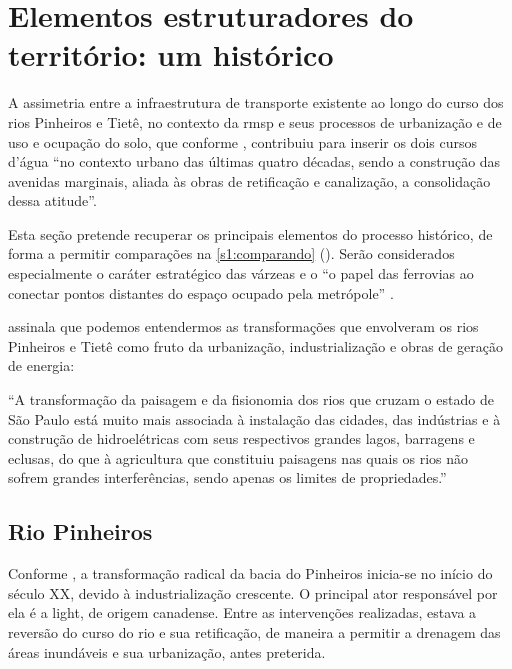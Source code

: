 \documentclass[
article,			%
11pt,				%
oneside,			%
a4paper,			%
english,			%
brazil,				%
sumario=tradicional
]{abntex2}
\begin{document}
	\section{Elementos estruturadores do território: um histórico} \label{s1:elementos}
	
	
	A assimetria entre a infraestrutura de transporte existente ao longo do curso dos rios Pinheiros e Tietê, no contexto da \glsdesc{rmsp} e seus processos de urbanização e de uso e ocupação do solo, que conforme , contribuiu para inserir os dois cursos d'água ``no contexto urbano das últimas quatro décadas, sendo a construção das avenidas marginais, aliada às obras de retificação e canalização, a consolidação dessa atitude''.
	
	Esta seção pretende recuperar os principais elementos do processo histórico, de forma a permitir comparações na \autoref{s1:comparando} (). Serão considerados especialmente o caráter estratégico das várzeas \cite[p.63]{franco2005a} e o ``o papel das ferrovias ao conectar pontos distantes do espaço ocupado pela metrópole'' \cite[p.63]{franco2005a}.
	
	 assinala que podemos entendermos as transformações que envolveram os rios Pinheiros e Tietê como fruto da urbanização, industrialização e obras de geração de energia:
	
	\begin{citacao}
		``A transformação da paisagem e da fisionomia dos rios que cruzam o estado de São Paulo está muito mais associada à instalação das cidades, das indústrias e à construção de hidroelétricas com seus respectivos grandes lagos, barragens e eclusas, do que à agricultura que constituiu paisagens nas quais os rios não sofrem grandes interferências, sendo apenas os limites de propriedades.''
	\end{citacao}
	
	\subsection{Rio Pinheiros} \label{s2:riopinheiros}
	
	
	Conforme , a transformação radical da bacia do Pinheiros inicia-se no início do século XX, devido à industrialização crescente. O principal ator responsável por ela é a \glsdesc{light}, de origem canadense. Entre as intervenções realizadas, estava a reversão do curso do rio e sua retificação, de maneira a permitir a drenagem das áreas inundáveis e sua urbanização, antes preterida.
	
\end{document}
